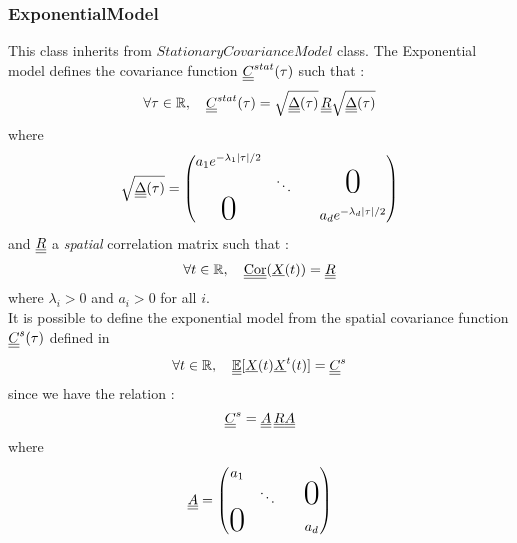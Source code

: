 \newpage \subsubsection{ExponentialModel}

\label{expModel}

This class inherits from $StationaryCovarianceModel$ class. The Exponential model defines the covariance function   ${\underline{\underline{C}}}^{stat}(\tau)$ such that :
\begin{equation}
\label{fullMultivariateExponential2}
\forall \tau\in\mathbb{R},\quad {\underline{\underline{C}}}^{stat}(\tau)=\sqrt{{\underline{\underline{\Delta}}}(\tau)}\,{\underline{\underline{R}}}\sqrt{{\underline{\underline{\Delta}}}(\tau)}
\end{equation}
where
\begin{equation}
\sqrt{\mat{\Delta}(\tau)}=
\begin{pmatrix}
  a_1e^{-\lambda_1|\tau|/2} & & & \\
                       &\ddots & & \text{\Huge{0}}\\
  \text{\Huge{0}}      & & & a_de^{-\lambda_d|\tau|/2}
\end{pmatrix}
\end{equation}
and ${\underline{\underline{R}}}$ a \emph{spatial} correlation matrix such that : 
\begin{equation}
\label{fullMultivariateExponential1}
\forall t\in\mathbb{R},\quad{\underline{\underline{\text{Cor}}}}({\underline{X}}(t))={\underline{\underline{R}}}
\end{equation}
where $\lambda_i>0$ and $a_i>0$ for all $i$.\\

It is possible to define the exponential model from the spatial covariance function ${\underline{\underline{C}}}^s(\tau)$ defined in 
\begin{equation}
  \forall t\in\mathbb{R},\quad{\underline{\underline{\mathbb{E}}}}[{\underline{X}}(t){\underline{X}}^t(t)]={\underline{\underline{C}}}^s
\end{equation}
since we have the relation :
\begin{equation}\label{RClinkUM}
{\underline{\underline{C}}}^s={\underline{\underline{A}}}\,{\underline{\underline{R}}}{\underline{\underline{A}}}
\end{equation}
where
\begin{equation}
\mat{A}=
\begin{pmatrix}
  a_1 & & & \\
                       &\ddots & & \text{\Huge{0}}\\
  \text{\Huge{0}}      & & & a_d
\end{pmatrix}
\end{equation}

